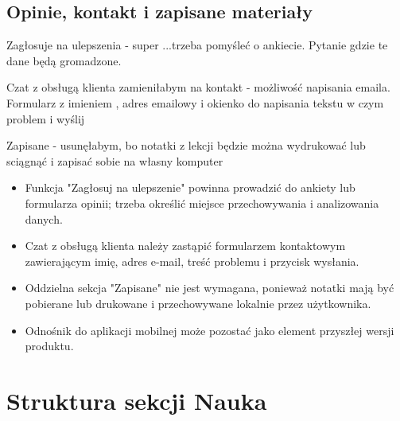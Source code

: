 \documentclass[12pt,a4paper]{report}
\begin{document}
\section{Opinie, kontakt i zapisane materiały}
\begin{ElearnReviewComment}[title={Komentarz nr 4 -- Anna Kogut, 2026-07-22}]
Zagłosuje na ulepszenia - super ...trzeba pomyśleć o ankiecie. Pytanie gdzie te dane będą gromadzone.

Czat z obsługą klienta zamieniłabym na kontakt - możliwość napisania emaila. Formularz z imieniem , adres emailowy i okienko do napisania tekstu w czym problem i wyślij

Zapisane - usunęłabym, bo notatki z lekcji będzie można wydrukować lub sciągnąć i zapisać sobie na własny komputer
\end{ElearnReviewComment}
\begin{ElearnRequirement}[title={Wymagania wynikające z komentarza}]
\begin{itemize}
  \item Funkcja "Zagłosuj na ulepszenie" powinna prowadzić do ankiety lub formularza opinii; trzeba określić miejsce przechowywania i analizowania danych.
  \item Czat z obsługą klienta należy zastąpić formularzem kontaktowym zawierającym imię, adres e-mail, treść problemu i przycisk wysłania.
  \item Oddzielna sekcja "Zapisane" nie jest wymagana, ponieważ notatki mają być pobierane lub drukowane i przechowywane lokalnie przez użytkownika.
  \item Odnośnik do aplikacji mobilnej może pozostać jako element przyszłej wersji produktu.
\end{itemize}
\end{ElearnRequirement}
\clearpage
\chapter{Struktura sekcji Nauka}
\end{document}
